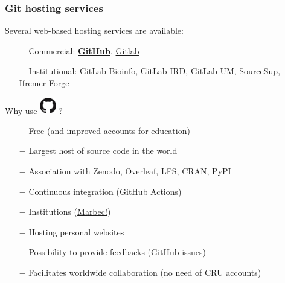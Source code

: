 \documentclass[svgnames]{beamer}
\begin{document}
\begin{frame}
\frametitle{Git hosting services}

Several web-based hosting services are available:

\begin{itemize}
\item[$-$]{Commercial: \textbf{\href{https://github.com/}{GitHub}}, \href{https://gitlab.com/}{Gitlab}}
\item[$-$]{Institutional: \href{https://gitlab-bioinfo.ird.fr/}{GitLab Bioinfo}, 
\href{https://gitlab-bioinfo.ird.fr/}{GitLab IRD},
\href{https://gitlab.mbb.univ-montp2.fr/}{GitLab UM},
\href{https://sourcesup.renater.fr/}{SourceSup},
\href{https://forge.ifremer.fr/}{Ifremer Forge}
}



\end{itemize}

Why use \includegraphics[height=20pt]{img/GitHub-Mark-120px-plus.png}  ?
\begin{itemize}
\item[$-$]{Free (and improved accounts for education)}
\item[$-$]{Largest host of source code in the world}
\item[$-$]{Association with Zenodo, Overleaf, LFS, CRAN, PyPI}
\item[$-$]{Continuous integration (\href{https://github.com/features/actions}{GitHub Actions})}
\item[$-$]{Institutions (\href{https://github.com/umr-marbec}{Marbec!})}
\item[$-$]{Hosting personal websites}
\item[$-$]{Possibility to provide feedbacks (\href{https://docs.github.com/en/github/managing-your-work-on-github/about-issues}{GitHub issues})}
\item[$-$] Facilitates worldwide collaboration (no need of CRU accounts)
\end{itemize}

\end{frame}
\end{document}
